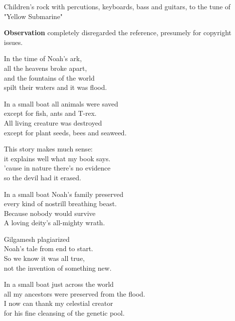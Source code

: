 

\begin{notes}
\end{notes}
\begin{style}
Children's rock with percutions, keyboards, bass and guitars, to the tune of "Yellow Submarine"

\textbf{Observation} completely disregarded the reference, presumely for copyright issues.
\end{style}
\begin{lyrics}
In the time of Noah's ark,\\
all the heavens broke apart,\\
and the fountains of the world\\
spilt their waters and it was flood.

In a small boat all animals were saved\\
except for fish, ants and T-rex.\\
All living creature was destroyed\\
except for plant seeds, bees and seaweed.

This story makes much sense:\\
it explains well what my book says.\\
’cause in nature there’s no evidence\\
so the devil had it erased.

In a small boat Noah’s family preserved\\
every kind of nostrill breathing beast.\\
Because nobody would survive\\
A loving deity's all-mighty wrath.

Gilgamesh plagiarized\\
Noah's tale from end to start.\\
So we know it was all true,\\
not the invention of something new.

In a small boat just across the world\\
all my ancestors were preserved from the flood.\\
I now can thank my celestial creator\\
for his fine cleansing of the genetic pool.
\end{lyrics}

